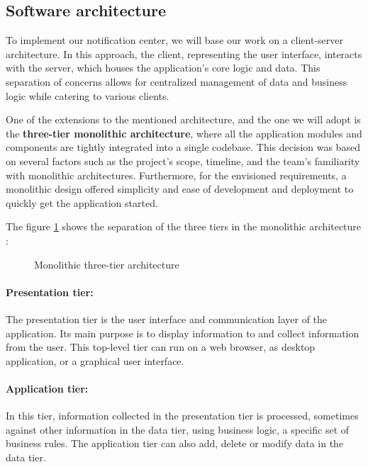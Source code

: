 \subsection{Software architecture}
To implement our notification center, we will base our work on a client-server architecture.
In this approach, the client, representing the user interface, interacts with the server, which houses
the application's core logic and data. This separation of concerns allows for centralized management
of data and business logic while catering to various clients.

One of the extensions to the mentioned architecture, and the one we will adopt is
the \textbf{three-tier monolithic architecture}, where all the application modules and components
are tightly integrated into a single codebase. This decision was based on several factors such as
the project's scope, timeline, and the team's familiarity with monolithic architectures.
Furthermore, for the envisioned requirements, a monolithic design offered simplicity and ease
of development and deployment to quickly get the application started.

\noindent The figure \ref{monolithic} shows the separation of the three tiers in the monolithic architecture : \\

\begin{figure}[hbt!]
      \centering
      
      \caption{Monolithic three-tier architecture}
      \label{monolithic}
\end{figure}

\paragraph{Presentation tier:}
The presentation tier is the user interface and communication layer of the application. Its main purpose
is to display information to and collect information from the user. This top-level tier can run on a web
browser, as desktop application, or a graphical user interface.

\paragraph{Application tier:}
In this tier, information collected in the presentation tier is processed, sometimes against other
information in the data tier, using business logic, a specific set of business rules. The application
tier can also add, delete or modify data in the data tier.

